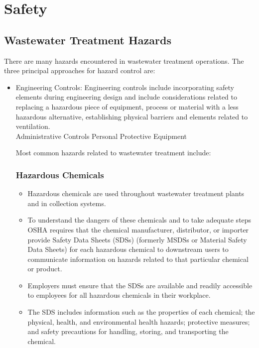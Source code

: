 \chapter{Safety}
\section{Wastewater Treatment Hazards}
There are many hazards encountered in wastewater treatment operations.  
The three principal approaches for hazard control are:
\begin{itemize}
\item Engineering Controls:  Engineering controls include incorporating safety elements during engineering design and include considerations related to replacing a hazardous piece of equipment, process or material with a less hazardous alternative, establishing  physical barriers and elements related to ventilation.\\ 
Administrative Controls
Personal Protective Equipment




Most common hazards related to wastewater treatment include:\\
\subsection{Hazardous Chemicals}
\begin{itemize}
\item Hazardous chemicals are used throughout wastewater treatment plants and in collection systems. 
\item To understand the dangers of these chemicals and to take adequate steps OSHA requires that the chemical manufacturer, distributor, or importer provide Safety Data Sheets (SDSs) (formerly MSDSs or Material Safety Data Sheets) for each hazardous chemical to downstream users to communicate information on hazards related to that particular chemical or product.
\item Employers must ensure that the SDSs are available and readily accessible to employees for all hazardous chemicals in their workplace.
\item The SDS includes information such as the properties of each chemical; the physical, health, and environmental health hazards; protective measures; and safety precautions for handling, storing, and transporting the chemical.\\
\end{itemize}

\end{itemize}
